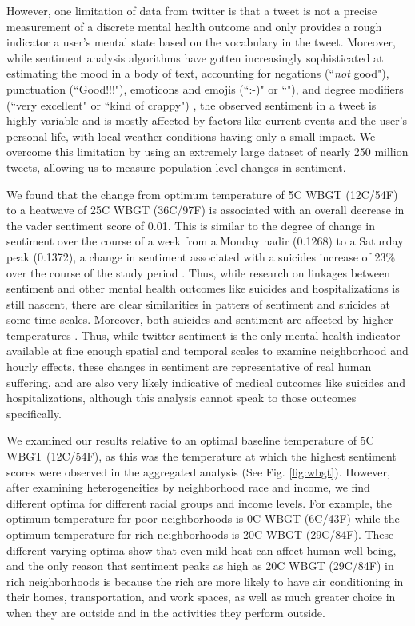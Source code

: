 \documentclass{article}
\begin{document}
However, one limitation of data from twitter is that a tweet is not a precise measurement of a discrete mental health outcome and only provides a rough indicator a user's mental state based on the vocabulary in the tweet.  Moreover, while sentiment analysis algorithms have gotten increasingly sophisticated at estimating the mood in a body of text, accounting for negations (``\textit{not} good"), punctuation (``Good!!!"), emoticons and emojis (``:-)" or ``\emojismile"), and degree modifiers (``very excellent" or ``kind of crappy") \cite{hutto2014vader}, the observed sentiment in a tweet is highly variable and is mostly affected by factors like current events and the user's personal life, with local weather conditions having only a small impact.  We overcome this limitation by using an extremely large dataset of nearly 250 million tweets, allowing us to measure population-level changes in sentiment.

We found that the change from optimum temperature of 5\textdegree C WBGT (12\textdegree C/54\textdegree F) to a heatwave of 25\textdegree C WBGT (36\textdegree C/97\textdegree F) is associated with an overall decrease in the vader sentiment score of 0.01.  This is similar to the degree of change in sentiment over the course of a week from a Monday nadir (0.1268) to a Saturday peak (0.1372), a change in sentiment associated with a suicides increase of 23\% over the course of the study period \cite{CDC2021}.  Thus, while research on linkages between sentiment and other mental health outcomes like suicides and hospitalizations is still nascent, there are clear similarities in patters of sentiment and suicides at some time scales.  Moreover, both suicides and sentiment are affected by higher temperatures \cite{baylis_weather_2018, Burke2018Aug}.  Thus, while twitter sentiment is the only mental health indicator available at fine enough spatial and temporal scales to examine neighborhood and hourly effects, these changes in sentiment are representative of real human suffering, and are also very likely indicative of medical outcomes like suicides and hospitalizations, although this analysis cannot speak to those outcomes specifically.

We examined our results relative to an optimal baseline temperature of 5\textdegree C WBGT (12\textdegree C/54\textdegree F), as this was the temperature at which the highest sentiment scores were observed in the aggregated analysis (See Fig. \ref{fig:wbgt}).  However, after examining heterogeneities by neighborhood race and income, we find different optima for different racial groups and income levels.  For example, the optimum temperature for poor neighborhoods is 0\textdegree C WBGT (6\textdegree C/43\textdegree F) while the optimum temperature for rich neighborhoods is 20\textdegree C WBGT (29\textdegree C/84\textdegree F).  These different varying optima show that even mild heat can affect human well-being, and the only reason that sentiment peaks as high as 20\textdegree C WBGT (29\textdegree C/84\textdegree F) in rich neighborhoods is because the rich are more likely to have air conditioning in their homes, transportation, and work spaces, as well as much greater choice in when they are outside and in the activities they perform outside.
\end{document}
